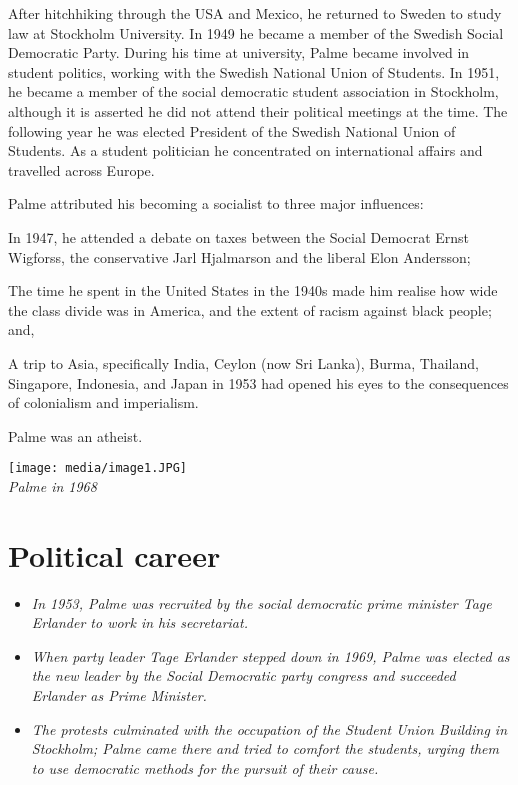 After hitchhiking through the USA and Mexico, he returned to Sweden to
study law at Stockholm University. In 1949 he became a member of the
Swedish Social Democratic Party. During his time at university, Palme
became involved in student politics, working with the Swedish National
Union of Students. In 1951, he became a member of the social democratic
student association in Stockholm, although it is asserted he did not
attend their political meetings at the time. The following year he was
elected President of the Swedish National Union of Students. As a
student politician he concentrated on international affairs and
travelled across Europe.

Palme attributed his becoming a socialist to three major influences:

In 1947, he attended a debate on taxes between the Social Democrat Ernst
Wigforss, the conservative Jarl Hjalmarson and the liberal Elon
Andersson;

The time he spent in the United States in the 1940s made him realise how
wide the class divide was in America, and the extent of racism against
black people; and,

A trip to Asia, specifically India, Ceylon (now Sri Lanka), Burma,
Thailand, Singapore, Indonesia, and Japan in 1953 had opened his eyes to
the consequences of colonialism and imperialism.

Palme was an atheist.

\texttt{[image: media/image1.JPG]}\\
\emph{Palme in 1968}

\section{Political career}\label{political-career}

\begin{itemize}
\item
  \emph{In 1953, Palme was recruited by the social democratic prime
  minister Tage Erlander to work in his secretariat.}
\item
  \emph{When party leader Tage Erlander stepped down in 1969, Palme was
  elected as the new leader by the Social Democratic party congress and
  succeeded Erlander as Prime Minister.}
\item
  \emph{The protests culminated with the occupation of the Student Union
  Building in Stockholm; Palme came there and tried to comfort the
  students, urging them to use democratic methods for the pursuit of
  their cause.}
\end{itemize}

